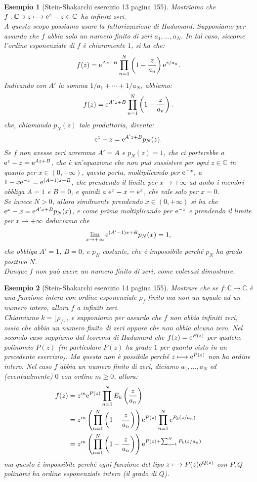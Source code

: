 \documentclass[11pt]{book}
\theoremstyle{Definizione}
\theoremstyle{TeoremaProposizioneLemmaCorollarioCongettura}
\theoremstyle{OsservazioneNotaEsempio}
\newtheorem{myes}{Esempio}[section]
\newcommand{\C}{\mathbb{C}}
\newcommand{\e}{\textup{e}}
\begin{document}
\begin{myes}[Stein-Shakarchi esercizio 13 pagina 155]\label{es:SteinShakarchiEs13pag155}
Mostriamo che $f:\C \ni z \longmapsto \e^{z}-z\in \C$ ha infiniti zeri.\\
A questo scopo possiamo usare la fattorizzazione di Hadamard. Supponiamo per assurdo che $f$ abbia solo un numero finito di zeri $a_1,\dots,a_N$. In tal caso, siccome l'ordine esponenziale di $f$ è chiaramente $1$, si ha che:
$$
f(z) = \e^{Az+B} \prod_{n = 1}^N \left(1-\frac{z}{a_n}\right)\e^{z/a_n}.
$$
Indicando con $A'$ la somma $1/a_1+\cdots+1/a_N$, abbiamo:
$$
f(z) = \e^{A'z+B}\prod_{n = 1}^N \left(1-\frac{z}{a_n}\right).
$$
che, chiamando $p_N(z)$ tale produttoria, diventa:
$$
\e^{z}-z = \e^{A'z+B}p_N(z).
$$
Se $f$ non avesse zeri avremmo $A' = A$ e $p_N(z) = 1$, che ci porterebbe a $\e^{z}-z = \e^{Az+B}$, che è un'equazione che non può sussistere per ogni $z\in \C$ in quanto per $x\in (0,+\infty)$, questa porta, moltiplicando per $\e^{-x}$, a $1-x\e^{-x} = \e^{(A-1)x+B}$, che prendendo il limite per $x \to +\infty$ ad ambo i membri obbliga $A = 1$ e $B = 0$, e quindi a $\e^{x}-x = \e^{x}$, che vale solo per $x = 0$.\\
Se invece $N > 0$, allora similmente prendendo $x\in (0,+\infty)$ si ha che $\e^{x}-x = \e^{A'x+B}p_N(x)$, e come prima moltiplicando per $\e^{-x}$ e prendendo il limite per $x \to +\infty$ deduciamo che
$$
\lim_{x\to +\infty} \e^{(A'-1)x+B}p_N(x) = 1,
$$
che obbliga $A' = 1$, $B = 0$, e $p_N$ costante, che è impossibile perché $p_N$ ha grado positivo $N$.\\
Dunque $f$ non può avere un numero finito di zeri, come volevasi dimostrare.
\end{myes}
\begin{myes}[Stein-Shakarchi esercizio 14 pagina 155]\label{es:SteinShakarchiEs14pag155}
Mostrare che se $f:\C\longrightarrow \C$ è una funzione intera con ordine esponenziale $\rho_f$ finito ma non un uguale ad un numero intero, allora $f$ a infiniti zeri.\\
Chiamiamo $k = \lfloor \rho_f\rfloor$, e supponiamo per assurdo che $f$ non abbia infiniti zeri, ossia che abbia un numero finito di zeri oppure che non abbia alcuno zero. Nel secondo caso sappiamo dal teorema di Hadamard che $f(z) = \e^{P(z)}$ per qualche polinomio $P(z)$ (in particolare $P(z)$ ha grado $1$ per quanto visto in un precedente esercizio). Ma questo non è possibile perché $z \longmapsto \e^{P(z)}$ non ha ordine intero. Nel caso $f$ abbia un numero finito di zeri, diciamo $a_1,\dots,a_N$ ed (eventualmente) $0$ con ordine $m\geq 0$, allora:
\begin{align*}
f(z) &= z^{m} \e^{P(z)} \prod_{n = 1}^N E_k\left(\frac{z}{a_n}\right) \\
&= z^m \left(\prod_{n = 1}^N \left(1-\frac{z}{a_n}\right)\right)\e^{P(z)} \prod_{n = 1}^N \e^{P_k(z/a_n)}\\
&= z^m \left(\prod_{n = 1}^N \left(1-\frac{z}{a_n}\right)\right)\e^{P(z)+\sum_{n = 1}^N P_k(z/a_n)}
\end{align*}
ma questo è impossibile perché ogni funzione del tipo $z \longmapsto P(z)\e^{Q(z)}$ con $P,Q$ polinomi ha ordine esponenziale intero (il grado di $Q$).
\end{myes}
\end{document}
